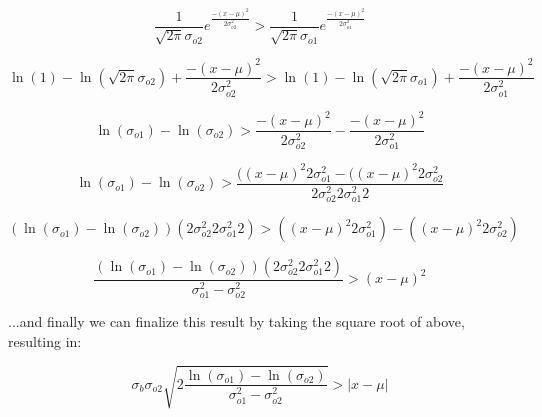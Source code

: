 \documentclass{article}
\begin{document}
\begin {equation}
    \frac{1}{\sqrt{2\pi}\sigma_{o2}}e^{\frac{-(x-\mu)^2}{2\sigma^2_{o2}}}
    >
    \frac{1}{\sqrt{2\pi}\sigma_{o1}}e^{\frac{-(x-\mu)^2}{2\sigma^2_{o1}}}
\end{equation}


\begin{equation}
    \ln(1) - \ln(\sqrt{2\pi}\sigma_{o2}) + \frac{-(x-\mu)^2}{2\sigma^2_{o2}}
    >
    \ln(1) - \ln(\sqrt{2\pi}\sigma_{o1}) + \frac{-(x-\mu)^2}{2\sigma^2_{o1}}
\end{equation}

\begin{equation}
    \ln(\sigma_{o1}) - \ln(\sigma_{o2}) > \frac{-(x-\mu)^2}{2\sigma^2_{o2}} - \frac{-(x-\mu)^2}{2\sigma^2_{o1}}
\end{equation}

\begin{equation}
    \ln(\sigma_{o1}) - \ln(\sigma_{o2}) > \frac{((x-\mu)^2 2\sigma_{o1}^2 - ((x-\mu)^2 2\sigma_{o2}^2 }{2\sigma^2_{o2}2 \sigma^2_{o1}2}
\end{equation}

\begin{equation}
    (\ln(\sigma_{o1}) - \ln(\sigma_{o2})) (2\sigma^2_{o2}2 \sigma^2_{o1}2)  > ((x-\mu)^2 2\sigma_{o1}^2) - ((x-\mu)^2 2\sigma_{o2}^2)
\end{equation}

\begin{equation}
    \frac{(\ln(\sigma_{o1}) - \ln(\sigma_{o2})) (2\sigma^2_{o2}2 \sigma^2_{o1}2)}{\sigma_{o1}^2 - \sigma_{o2}^2} > (x - \mu)^2
\end{equation}

...and finally we can finalize this result by taking the square root of above, resulting in:

\begin{equation}
    \sigma_b \sigma_{o2} \sqrt{2\frac{\ln(\sigma_{o1}) - \ln(\sigma_{o2})}{\sigma_{o1}^2 - \sigma_{o2}^2}} > \vert x - \mu \vert
\end{equation}
\end{document}
